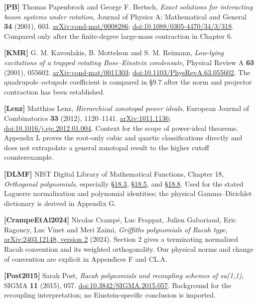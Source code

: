 \textbf{{[}PB{]}} Thomas Papenbrock and George F. Bertsch, \emph{Exact solutions for interacting boson systems under rotation}, Journal of Physics A: Mathematical and General \textbf{34} (2001), 603. \href{https://arxiv.org/abs/cond-mat/0008286}{arXiv:cond-mat/0008286}; \href{https://doi.org/10.1088/0305-4470/34/3/318}{doi:10.1088/0305-4470/34/3/318}. Compared only after the finite-degree large-mass contraction in Chapter 6.

\textbf{{[}KMR{]}} G. M. Kavoulakis, B. Mottelson and S. M. Reimann, \emph{Low-lying excitations of a trapped rotating Bose--Einstein condensate}, Physical Review A \textbf{63} (2001), 055602. \href{https://arxiv.org/abs/cond-mat/0011303}{arXiv:cond-mat/0011303}; \href{https://doi.org/10.1103/PhysRevA.63.055602}{doi:10.1103/PhysRevA.63.055602}. The quadrupole--octupole coefficient is compared in §9.7 after the norm and projector contraction has been established.

\textbf{{[}Lenz{]}} Matthias Lenz, \emph{Hierarchical zonotopal power ideals}, European Journal of Combinatorics \textbf{33} (2012), 1120--1141. \href{https://arxiv.org/abs/1011.1136}{arXiv:1011.1136}; \href{https://doi.org/10.1016/j.ejc.2012.01.004}{doi:10.1016/j.ejc.2012.01.004}. Context for the scope of power-ideal theorems. Appendix L proves the root-only cubic and quartic classifications directly and does not extrapolate a general zonotopal result to the higher cutoff counterexample.

\textbf{{[}DLMF{]}} NIST Digital Library of Mathematical Functions, Chapter 18, \emph{Orthogonal polynomials}, especially \href{https://dlmf.nist.gov/18.3}{§18.3}, \href{https://dlmf.nist.gov/18.5}{§18.5}, and \href{https://dlmf.nist.gov/18.8}{§18.8}. Used for the stated Laguerre normalization and polynomial identities; the physical Gamma--Dirichlet dictionary is derived in Appendix G.

\textbf{{[}CrampeEtAl2024{]}} Nicolas Crampé, Luc Frappat, Julien Gaboriaud, Eric Ragoucy, Luc Vinet and Meri Zaimi, \emph{Griffiths polynomials of Racah type}, \href{https://arxiv.org/html/2403.12148v2}{arXiv:2403.12148, version 2} (2024). Section 2 gives a terminating normalized Racah convention and its weighted orthogonality. Our physical norms and change of convention are explicit in Appendices F and CL.A.

\textbf{{[}Post2015{]}} Sarah Post, \emph{Racah polynomials and recoupling schemes of su(1,1)}, SIGMA \textbf{11} (2015), 057. \href{https://doi.org/10.3842/SIGMA.2015.057}{doi:10.3842/SIGMA.2015.057}. Background for the recoupling interpretation; no Einstein-specific conclusion is imported.

